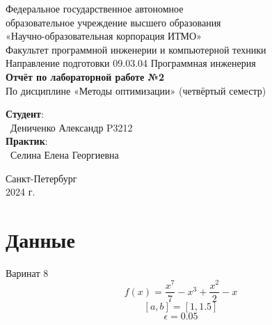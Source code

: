 \documentclass{article}
\begin{document}
\begin{center}
    \Large
    Федеральное государственное автономное \\
    образовательное учреждение высшего образования \\ 
    «Научно-образовательная корпорация ИТМО»\\
    \vspace{0.5cm}
    \large
    Факультет программной инженерии и компьютерной техники \\
    Направление подготовки 09.03.04 Программная инженерия \\
    \vspace{1cm}
    \Large
    \textbf{Отчёт по лабораторной работе №2} \\
    По дисциплине «Методы оптимизации» (четвёртый семестр)\\
    \large
    \vspace{8cm}

    \begin{minipage}{.33\textwidth}
    \end{minipage}
    \hfill
    \begin{minipage}{.4\textwidth}
    
        \textbf{Студент}: \vspace{.1cm} \\
        \ Дениченко Александр P3212\\
        \textbf{Практик}:  \\
        \ Селина Елена Георгиевна
    \end{minipage}
    \vfill
Санкт-Петербург\\ 2024 г.
\end{center}
\pagestyle{empty}
\newpage
\pagestyle{plain}
\section*{Данные}
Варинат 8
\[f(x) = \frac{x^7}{7} - x^3 + \frac{x^2}{2} - x\]
\[[a, b] = [1, 1.5]\]
\[\epsilon = 0.05\]
\end{document}
